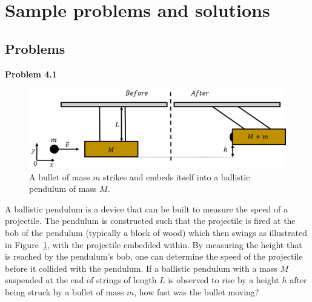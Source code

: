 \documentclass[9pt,arxiv,red]{lapreprint}
\begin{document}
\section{Sample problems and solutions}

\subsection{Problems}

\begin{framed}
\textbf{Problem 4.1}\\
\begin{figure}[!htbp]
\centering
\includegraphics[width=0.7\linewidth]{files/ballistic-469d6db369fd5a1d3f5f71a368e7d9d4.png}
\caption[]{A bullet of mass $m$ strikes and embeds itself into a ballistic pendulum of mass $M$.}
\label{fig:momentumandcm:ballistic}
\end{figure}

A ballistic pendulum is a device that can be built to measure the speed of a projectile. The pendulum is constructed such that the projectile is fired at the bob of the pendulum (typically a block of wood) which then swings as illustrated in Figure~\ref{fig:momentumandcm:ballistic}, with the projectile embedded within. By measuring the height that is reached by the pendulum's bob, one can determine the speed of the projectile before it collided with the pendulum. If a ballistic pendulum with a mass $M$ suspended at the end of strings of length $L$ is observed to rise by a height $h$ after being struck by a bullet of mass $m$, how fast was the bullet moving?
\end{framed}
\end{document}
